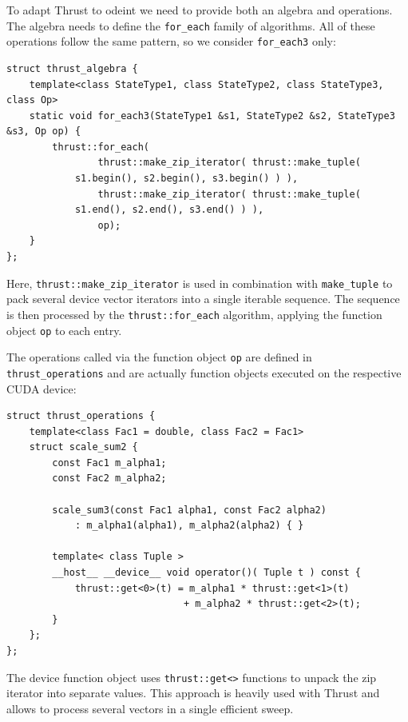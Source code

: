 \documentclass[final]{siamltex}
\newcommand{\code}[1]{\lstinline|#1|}
\begin{document}
To adapt Thrust to odeint we need to provide both an algebra and
operations. The algebra needs to define the \code{for_each} family of
algorithms. All of these operations follow the same pattern,
so we consider \code{for_each3} only:
\begin{lstlisting}
struct thrust_algebra {
    template<class StateType1, class StateType2, class StateType3, class Op>
    static void for_each3(StateType1 &s1, StateType2 &s2, StateType3 &s3, Op op) {
        thrust::for_each(
                thrust::make_zip_iterator( thrust::make_tuple(
 		    s1.begin(), s2.begin(), s3.begin() ) ),
                thrust::make_zip_iterator( thrust::make_tuple(
		    s1.end(), s2.end(), s3.end() ) ),
                op);
    }
};
\end{lstlisting}
Here, \code{thrust::make_zip_iterator} is used in combination with \code{make_tuple}
to pack several device vector iterators into a single iterable sequence.
The sequence is then processed by the \code{thrust::for_each} algorithm, applying the function object
\code{op} to each entry.

The operations called via the function object \code{op} are defined in \code{thrust_operations}
and are actually function objects executed on the respective CUDA device:
\begin{lstlisting}
struct thrust_operations {
    template<class Fac1 = double, class Fac2 = Fac1>
    struct scale_sum2 {
        const Fac1 m_alpha1;
        const Fac2 m_alpha2;

        scale_sum3(const Fac1 alpha1, const Fac2 alpha2)
            : m_alpha1(alpha1), m_alpha2(alpha2) { }

        template< class Tuple >
        __host__ __device__ void operator()( Tuple t ) const {
            thrust::get<0>(t) = m_alpha1 * thrust::get<1>(t)
                               + m_alpha2 * thrust::get<2>(t);
        }
    };
};
\end{lstlisting}
The device function object uses \code{thrust::get<>} functions to unpack the zip iterator into separate values.
This approach is heavily used with Thrust and allows to process several vectors
in a single efficient sweep.
\end{document}
